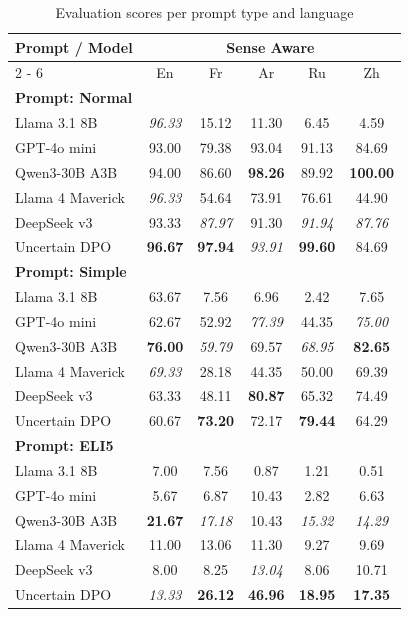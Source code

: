 \documentclass{article}%
\begin{document}
%
\normalsize%


\begin{table}[h!]%
\centering%
\small%
\setlength{\tabcolsep}{4pt}%
\begin{tabular}{@{}lccccc@{}}%
\toprule%
\textbf{Prompt / Model} & \multicolumn{5}{c}{\textbf{Sense Aware}} \\%
\cmidrule(lr){2%
-%
6}%
&En&Fr&Ar&Ru&Zh\\%
\midrule%
\multicolumn{6}{l}{\textbf{Prompt: Normal}} \\%
Llama 3.1 8B&\textit{96.33}&15.12&11.30&6.45&4.59\\%
GPT{-}4o mini&93.00&79.38&93.04&91.13&84.69\\%
Qwen3{-}30B A3B&94.00&86.60&\textbf{98.26}&89.92&\textbf{100.00}\\%
Llama 4 Maverick&\textit{96.33}&54.64&73.91&76.61&44.90\\%
DeepSeek v3&93.33&\textit{87.97}&91.30&\textit{91.94}&\textit{87.76}\\%
Uncertain DPO&\textbf{96.67}&\textbf{97.94}&\textit{93.91}&\textbf{99.60}&84.69\\%
\midrule%
\multicolumn{6}{l}{\textbf{Prompt: Simple}} \\%
Llama 3.1 8B&63.67&7.56&6.96&2.42&7.65\\%
GPT{-}4o mini&62.67&52.92&\textit{77.39}&44.35&\textit{75.00}\\%
Qwen3{-}30B A3B&\textbf{76.00}&\textit{59.79}&69.57&\textit{68.95}&\textbf{82.65}\\%
Llama 4 Maverick&\textit{69.33}&28.18&44.35&50.00&69.39\\%
DeepSeek v3&63.33&48.11&\textbf{80.87}&65.32&74.49\\%
Uncertain DPO&60.67&\textbf{73.20}&72.17&\textbf{79.44}&64.29\\%
\midrule%
\multicolumn{6}{l}{\textbf{Prompt: ELI5}} \\%
Llama 3.1 8B&7.00&7.56&0.87&1.21&0.51\\%
GPT{-}4o mini&5.67&6.87&10.43&2.82&6.63\\%
Qwen3{-}30B A3B&\textbf{21.67}&\textit{17.18}&10.43&\textit{15.32}&\textit{14.29}\\%
Llama 4 Maverick&11.00&13.06&11.30&9.27&9.69\\%
DeepSeek v3&8.00&8.25&\textit{13.04}&8.06&10.71\\%
Uncertain DPO&\textit{13.33}&\textbf{26.12}&\textbf{46.96}&\textbf{18.95}&\textbf{17.35}\\\bottomrule%
%
\end{tabular}%
\caption{Evaluation scores per prompt type and language}%
\end{table}

%
\end{document}
